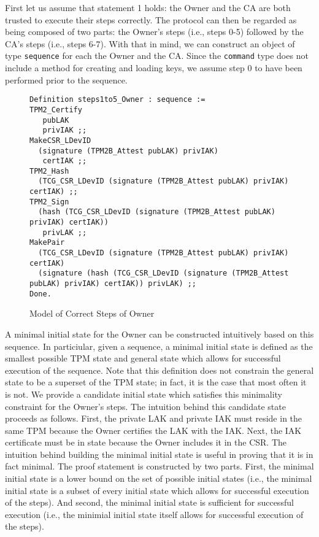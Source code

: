 First let us assume that statement 1 holds: the Owner and the CA are both trusted to execute their steps correctly. The protocol can then be regarded as being composed of two parts: the Owner's steps (i.e., steps 0-5) followed by the CA's steps (i.e., steps 6-7). With that in mind, we can construct an object of type \verb|sequence| for each the Owner and the CA. Since the \verb|command| type does not include a method for creating and loading keys, we assume step 0 to have been performed prior to the sequence. 
\begin{figure}[h]
\begin{lstlisting}[language=Coq]
Definition steps1to5_Owner : sequence :=
TPM2_Certify 
   pubLAK 
   privIAK ;;
MakeCSR_LDevID 
  (signature (TPM2B_Attest pubLAK) privIAK) 
   certIAK ;;
TPM2_Hash 
  (TCG_CSR_LDevID (signature (TPM2B_Attest pubLAK) privIAK) certIAK) ;;
TPM2_Sign 
  (hash (TCG_CSR_LDevID (signature (TPM2B_Attest pubLAK) privIAK) certIAK)) 
   privLAK ;;
MakePair 
  (TCG_CSR_LDevID (signature (TPM2B_Attest pubLAK) privIAK) certIAK) 
  (signature (hash (TCG_CSR_LDevID (signature (TPM2B_Attest pubLAK) privIAK) certIAK)) privLAK) ;;
Done. 
\end{lstlisting}
\caption{Model of Correct Steps of Owner}
\end{figure}
A minimal initial state for the Owner can be constructed intuitively based on this sequence. In particiular, given a sequence, a minimal initial state is defined as the smallest possible TPM state and general state which allows for successful execution of the sequence. Note that this definition does not constrain the general state to be a superset of the TPM state; in fact, it is the case that most often it is not. We provide a candidate initial state which satisfies this minimality constraint for the Owner's steps. The intuition behind this candidate state proceeds as follows. First, the private LAK and private IAK must reside in the same TPM because the Owner certifies the LAK with the IAK. Next, the IAK certificate must be in state because the Owner includes it in the CSR. The intuition behind building the minimal initial state is useful in proving that it is in fact minimal. The proof statement is constructed by two parts. First, the minimal initial state is a lower bound on the set of possible initial states (i.e., the minimal initial state is a subset of every initial state which allows for successful execution of the steps). And second, the minimal initial state is sufficient for successful execution (i.e., the minimial initial state itself allows for successful execution of the steps).
